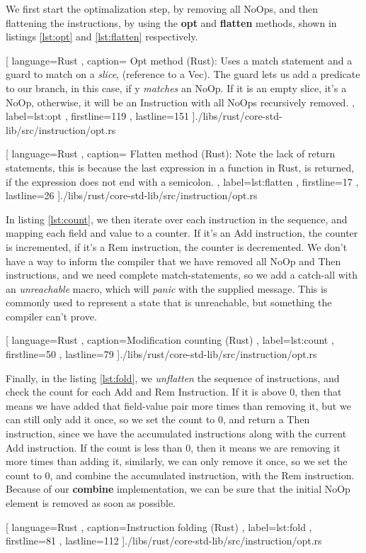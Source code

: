 We first start the optimalization step, by removing all NoOps, and then
flattening the instructions, by using the \textbf{opt} and \textbf{flatten}
methods, shown in listings \ref{lst:opt} and \ref{lst:flatten} respectively.

\begin{code}[H]
  
   [ language=Rust
   , caption={
     Opt method (Rust): Uses a match statement and a guard to match on a
     \textit{slice}, (reference to a Vec). The guard lets us add a predicate to
     our branch, in this case, if y \textit{matches} an NoOp. If it is an empty
     slice, it's a NoOp, otherwise, it will be an Instruction with all NoOps
     recursively removed.
   }
   , label=lst:opt
   , firstline=119
   , lastline=151
   ]{./libs/rust/core-std-lib/src/instruction/opt.rs}
\end{code}

\begin{code}[H]
  
   [ language=Rust
   , caption={
     Flatten method (Rust): Note the lack of return statements, this is because
     the last expression in a function in Rust, is returned, if the expression
     does not end with a semicolon.
   }
   , label=lst:flatten
   , firstline=17
   , lastline=26
   ]{./libs/rust/core-std-lib/src/instruction/opt.rs}
\end{code}

In listing \ref{lst:count}, we then iterate over each instruction in the
sequence, and mapping each field and value to a counter. If it's an Add
instruction, the counter is incremented, if it's a Rem instruction, the counter
is decremented. We don't have a way to inform the compiler that we have removed
all NoOp and Then instructions, and we need complete match-statements, so we add
a catch-all with an \textit{unreachable} macro, which will \textit{panic} with
the supplied message. This is commonly used to represent a state that is
unreachable, but something the compiler can't prove.

\begin{code}[H]
  
   [ language=Rust
   , caption={Modification counting (Rust)}
   , label=lst:count
   , firstline=50
   , lastline=79
   ]{./libs/rust/core-std-lib/src/instruction/opt.rs}
\end{code}

Finally, in the listing \ref{lst:fold}, we \textit{unflatten} the sequence of
instructions, and check the count for each Add and Rem Instruction. If it is
above $0$, then that means we have added that field-value pair more times than
removing it, but we can still only add it once, so we set the count to $0$, and
return a Then instruction, since we have the accumulated instructions along with
the current Add instruction. If the count is less than $0$, then it means we are
removing it more times than adding it, similarly, we can only remove it once, so
we set the count to $0$, and combine the accumulated instruction, with the Rem
instruction. Because of our \textbf{combine} implementation, we can be sure that
the initial NoOp element is removed as soon as possible.

\begin{code}[H]
  
   [ language=Rust
   , caption={Instruction folding (Rust)}
   , label=lst:fold
   , firstline=81
   , lastline=112
   ]{./libs/rust/core-std-lib/src/instruction/opt.rs}
\end{code}
